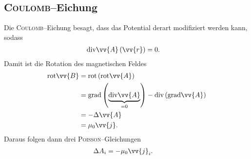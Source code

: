 \documentclass[a4paper,12pt]{article}
\numberwithin{equation}{section}
\begin{document}
\subsection{\textsc{Coulomb}--Eichung}
Die \textsc{Coulomb}--Eichung besagt, dass das Potential derart modifiziert werden kann, sodass 
\begin{align} 
        \text{div}\vv{A}\left(\vv{r}\right)&=0
.\end{align} 
Damit ist die Rotation des magnetischen Feldes
\begin{align} 
        \text{rot}\vv{B}&=\text{rot}\left(\text{rot}\vv{A}\right)\\
                        &=\text{grad}\left(\underbrace{\text{div}\vv{A}}_{=0}\right)-\text{div}\left(\text{grad}\vv{A}\right)\\
                        &=-\Delta \vv{A}\\
                        &=\mu _0\vv{j}
.\end{align} 
Daraus folgen dann drei \textsc{Poisson}--Gleichungen
\begin{align} 
        \Delta A_i&=-\mu _0\vv{j}_i
.\end{align}
\end{document}
